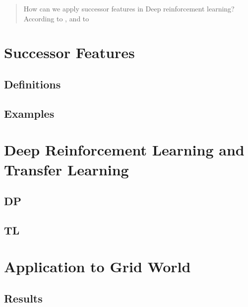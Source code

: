 \documentclass[11pt]{article}
\begin{document}
\maketitle

\begin{abstract}
How can we apply successor features in Deep reinforcement learning? According to \cite{lehnert2017advantages}, \cite{barreto2017successor} and to \cite{kulkarni2016deep}

\end{abstract}


\tableofcontents



\section{Successor Features}
\subsection{Definitions}

\subsection{Examples}

\section{Deep Reinforcement Learning and Transfer Learning}

\subsection{DP}

\subsection{TL}

\section{Application to Grid World}

\subsection{Results}






\end{document}
